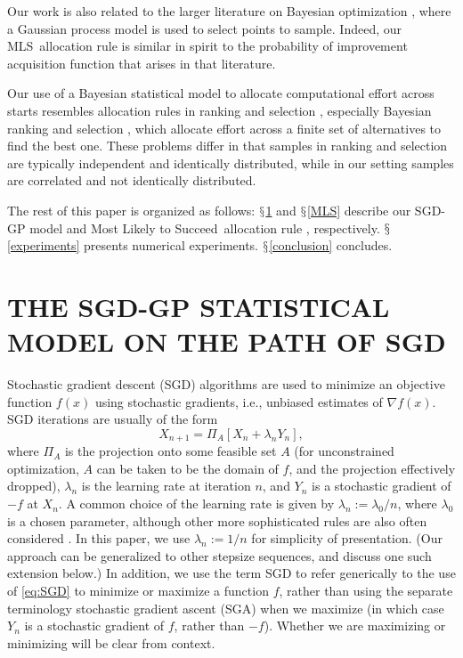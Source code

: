 \documentclass[12pt,english]{article}
\newcommand{\pfcomment}[1]{{\color{red} PF: #1}}
\newcommand{\stedit}[1]{{\color{blue} #1}}
\newcommand{\abbrv}{MLS}
\newcommand{\name}{Most Likely to Succeed}
\begin{document}
Our work is also related to the larger literature on Bayesian optimization \citep{jones1998efficient,forrester2008engineering,brochu2010tutorial,frazier2009knowledge}, where a Gaussian process model is used to select points to sample.  Indeed, our \abbrv\ allocation rule is similar in spirit to the probability of improvement acquisition function \citep{brochu2010tutorial}  that arises in that literature. 

Our use of a Bayesian statistical model to allocate computational effort across starts resembles allocation rules in ranking and selection \citep{Bechhofer:1995,kim:2007,kim:20062}, especially Bayesian ranking and selection \citep{frazier2009knowledge}, which allocate effort across a finite set of alternatives to find the best one.  These problems differ in that samples in ranking and selection are typically independent and identically distributed, while in our setting samples are correlated and not identically distributed.

The rest of this paper is organized as follows: $\mathsection$\ref{statistical_model} and $\mathsection$\ref{MLS} describe our SGD-GP model and \name\ allocation rule\stedit{, respectively}. $\mathsection$\ref{experiments} presents numerical experiments. $\mathsection$\ref{conclusion} concludes.

\section{THE SGD-GP STATISTICAL MODEL ON THE PATH OF SGD}
\label{statistical_model}

Stochastic gradient descent (SGD) algorithms are used to minimize an objective function $f(x)$ using stochastic gradients, i.e., unbiased estimates of $\nabla f(x)$. SGD iterations are usually of the form
\begin{equation}
X_{n+1}=\Pi_{A}\left[X_{n}+\lambda_{n}Y_{n}\right],\label{eq:SGD}
\end{equation}
where $\Pi_{A}$ is the projection onto some feasible set $A$ (for unconstrained optimization, $A$ can be taken to be the domain of $f$, and the projection effectively dropped),
$\lambda_{n}$ is the learning rate at iteration $n$, and $Y_{n}$ is a stochastic gradient of $-f$ at $X_{n}$.  A common choice of the learning rate is given by $\lambda_{n}:=\lambda_{0}/n$, where $\lambda_{0}$ is a chosen parameter, although other more sophisticated rules are also often considered \citep{powell2007approximate}. In this paper, we use  $\lambda_{n}:=1/n$ for simplicity of presentation. (Our approach can be generalized to other stepsize sequences, and discuss one such extension below.)  In addition, we use the term SGD to refer generically to the use of \eqref{eq:SGD} to minimize or maximize a function $f$, rather than using the separate terminology stochastic gradient ascent (SGA) when we maximize (in which case $Y_n$ is a stochastic gradient of $f$, rather than $-f$).  Whether we are maximizing or minimizing will be clear from context.
\end{document}
